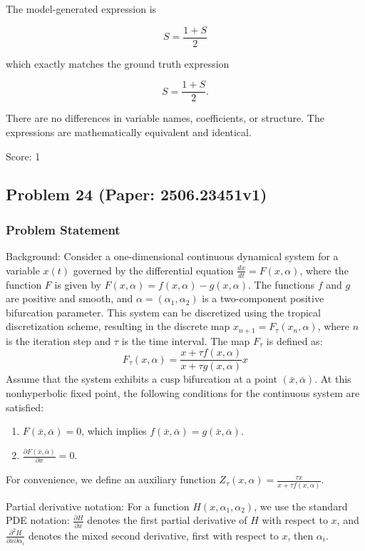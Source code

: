 \documentclass[10pt]{article}
\begin{document}
The model-generated expression is 

\[
S = \frac{1+S}{2}
\]

which exactly matches the ground truth expression 

\[
S = \frac{1+S}{2}.
\]

There are no differences in variable names, coefficients, or structure. The expressions are mathematically equivalent and identical.

Score: 1

\newpage
\subsection*{Problem 24 (Paper: 2506.23451v1)}
\subsubsection*{Problem Statement}
Background:
Consider a one-dimensional continuous dynamical system for a variable $x(t)$ governed by the differential equation $\frac{dx}{dt} = F(x, \alpha)$, where the function $F$ is given by $F(x, \alpha) = f(x, \alpha) - g(x, \alpha)$. The functions $f$ and $g$ are positive and smooth, and $\alpha = (\alpha_1, \alpha_2)$ is a two-component positive bifurcation parameter. This system can be discretized using the tropical discretization scheme, resulting in the discrete map $x_{n+1} = F_\tau(x_n, \alpha)$, where $n$ is the iteration step and $\tau$ is the time interval. The map $F_\tau$ is defined as:
\begin{equation*}
    F_\tau(x, \alpha) = \frac{x+\tau f(x,\alpha)}{x+\tau g(x,\alpha)} x
\end{equation*}
Assume that the system exhibits a cusp bifurcation at a point $(\bar{x}, \bar{\alpha})$. At this nonhyperbolic fixed point, the following conditions for the continuous system are satisfied:
\begin{enumerate}
    \item $F(\bar{x}, \bar{\alpha}) = 0$, which implies $f(\bar{x}, \bar{\alpha}) = g(\bar{x}, \bar{\alpha})$.
    \item $\displaystyle\frac{\partial F(\bar{x}, \bar{\alpha})}{\partial x} = 0$.
\end{enumerate}
For convenience, we define an auxiliary function $Z_\tau(x, \alpha) = \frac{\tau x}{x + \tau f(x, \alpha)}$.

Partial derivative notation: For a function $H(x, \alpha_1, \alpha_2)$, we use the standard PDE notation:
$\frac{\partial H}{\partial x}$ denotes the first partial derivative of $H$ with respect to $x$, and $\frac{\partial^2 H}{\partial x \partial \alpha_i}$ denotes the mixed second derivative, first with respect to $x$, then $\alpha_i$.
\end{document}
